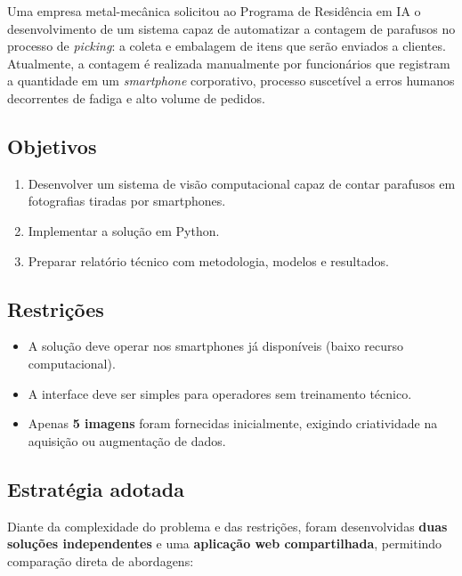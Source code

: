\documentclass[12pt,a4paper]{article}
\begin{document}
Uma empresa metal-mec\^anica solicitou ao Programa de Resid\^encia em IA o desenvolvimento de
um sistema capaz de automatizar a contagem de parafusos no processo de \emph{picking}: a
coleta e embalagem de itens que ser\~ao enviados a clientes. Atualmente, a contagem \'e
realizada manualmente por funcion\'arios que registram a quantidade em um \emph{smartphone}
corporativo, processo suscet\'ivel a erros humanos decorrentes de fadiga e alto volume de
pedidos.

\subsection{Objetivos}

\begin{enumerate}[leftmargin=*, label=\arabic*.]
  \item Desenvolver um sistema de vis\~ao computacional capaz de contar parafusos em
        fotografias tiradas por smartphones.
  \item Implementar a solu\c{c}\~ao em Python.
  \item Preparar relat\'orio t\'ecnico com metodologia, modelos e resultados.
\end{enumerate}

\subsection{Restri\c{c}\~oes}

\begin{itemize}[leftmargin=*]
  \item A solu\c{c}\~ao deve operar nos smartphones j\'a dispon\'iveis (baixo recurso
        computacional).
  \item A interface deve ser simples para operadores sem treinamento t\'ecnico.
  \item Apenas \textbf{5 imagens} foram fornecidas inicialmente, exigindo criatividade
        na aquisi\c{c}\~ao ou augmenta\c{c}\~ao de dados.
\end{itemize}

\subsection{Estrat\'egia adotada}

Diante da complexidade do problema e das restri\c{c}\~oes, foram desenvolvidas
\textbf{duas solu\c{c}\~oes independentes} e uma \textbf{aplica\c{c}\~ao web compartilhada},
permitindo compara\c{c}\~ao direta de abordagens:
\end{document}
